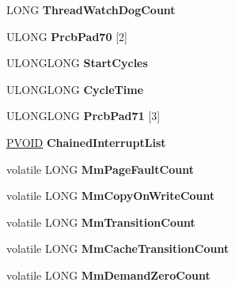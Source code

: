 \begin{DoxyCompactItemize}
L\+O\+NG {\bfseries Thread\+Watch\+Dog\+Count}
\item 
\mbox{\label{struct___k_p_r_c_b_a10ef1911c4d300230676b72ff8840e2d}} 
U\+L\+O\+NG {\bfseries Prcb\+Pad70} \mbox{[}2\mbox{]}
\item 
\mbox{\label{struct___k_p_r_c_b_a3812b8ee1b024df5f169c4f32d4a223a}} 
U\+L\+O\+N\+G\+L\+O\+NG {\bfseries Start\+Cycles}
\item 
\mbox{\label{struct___k_p_r_c_b_a6e71e44836f872f3fabeb6b6cd37daf3}} 
U\+L\+O\+N\+G\+L\+O\+NG {\bfseries Cycle\+Time}
\item 
\mbox{\label{struct___k_p_r_c_b_ad85215b23a9244688d12d5fac4e4cfe0}} 
U\+L\+O\+N\+G\+L\+O\+NG {\bfseries Prcb\+Pad71} \mbox{[}3\mbox{]}
\item 
\mbox{\label{struct___k_p_r_c_b_a3cabf4601b1d4e58de997dd252c65c24}} 
\hyperlink{interfacevoid}{P\+V\+O\+ID} {\bfseries Chained\+Interrupt\+List}
\item 
\mbox{\label{struct___k_p_r_c_b_ab36b499a2bab4bd33e49b0ac47276195}} 
volatile L\+O\+NG {\bfseries Mm\+Page\+Fault\+Count}
\item 
\mbox{\label{struct___k_p_r_c_b_a69637263bb9fa699158f64a5dfa6ed63}} 
volatile L\+O\+NG {\bfseries Mm\+Copy\+On\+Write\+Count}
\item 
\mbox{\label{struct___k_p_r_c_b_a5fdbb6ea5b41eb2ead6b5bbd1b1f085f}} 
volatile L\+O\+NG {\bfseries Mm\+Transition\+Count}
\item 
\mbox{\label{struct___k_p_r_c_b_adf5b8827f9dc215d847fcd1ad67de657}} 
volatile L\+O\+NG {\bfseries Mm\+Cache\+Transition\+Count}
\item 
\mbox{\label{struct___k_p_r_c_b_a26ea75d6d58a252a3f0aa1f89d7ef7f3}} 
volatile L\+O\+NG {\bfseries Mm\+Demand\+Zero\+Count}
\item 
\mbox{\label{struct___k_p_r_c_b_ac39b8d7e6f404a036af59cbcc2fcbf47}} 

\end{DoxyCompactItemize}
